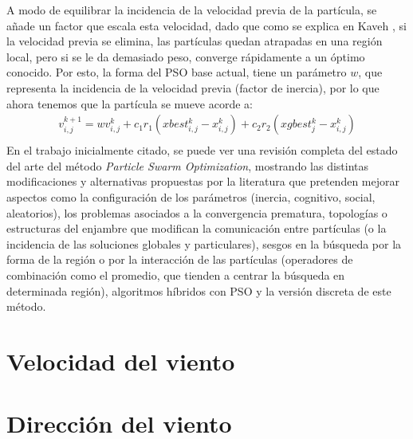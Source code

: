 A modo de equilibrar la incidencia de la velocidad previa de la partícula, se añade un factor que escala esta velocidad, dado que como se explica en Kaveh \cite{Psoexplain14}, si la velocidad previa se elimina, las partículas quedan atrapadas en una región local, pero si se le da demasiado peso, converge rápidamente a un óptimo conocido. Por esto, la forma del PSO base actual, tiene un parámetro $w$, que representa la incidencia de la velocidad previa (factor de inercia), por lo que ahora tenemos que la partícula se mueve acorde a: 
\begin{align*}
    v_{i,j}^{k+1} = wv_{i,j}^{k} + c_{1}r_{1}(xbest_{i,j}^k - x_{i,j}^k) + c_{2}r_{2}(xgbest_{j}^{k} - x_{i,j}^k)\\
\end{align*}    
En el trabajo inicialmente citado, se puede ver una revisión completa del estado del arte del método \emph{Particle Swarm Optimization}, mostrando las distintas modificaciones y alternativas propuestas por la literatura que pretenden mejorar aspectos como la configuración de los parámetros (inercia, cognitivo, social, aleatorios), los problemas asociados a la convergencia prematura, topologías o estructuras del enjambre que modifican la comunicación entre partículas (o la incidencia de las soluciones globales y particulares), sesgos en la búsqueda por la forma de la región o por la interacción de las partículas (operadores de combinación como el promedio, que tienden a centrar la búsqueda en determinada región), algoritmos híbridos con PSO y la versión discreta de este método. 
\section{Velocidad del viento}
\section{Dirección del viento}
